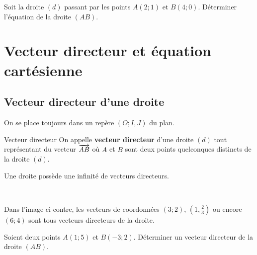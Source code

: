 \documentclass[11pt]{article}
\begin{document}
\begin{app}
  Soit la droite $(d)$ passant par les points $A\left( 2; 1 \right)$ et $B\left(
  4;0 \right)$. Déterminer l'équation de la droite $\left( AB \right)$.
\end{app}

\section{Vecteur directeur et équation cartésienne}
\subsection{Vecteur directeur d'une droite}
On se place toujours dans un repère $(O; I, J)$ du plan.
\begin{defi}{Vecteur directeur}
  On appelle \textbf{vecteur directeur} d'une droite $(d)$ tout représentant du vecteur
  $\overrightarrow{AB}$ où $A$ et $B$ sont deux points quelconques distincts de la droite
  $(d)$.
\end{defi}
\begin{rmq}
  Une droite possède une infinité de vecteurs directeurs.
\end{rmq}
\begin{exemple}~\\
  \begin{minipage}[]{.5\textwidth}
    Dans l'image ci-contre, les vecteurs de coordonnées $\left( 3; 2 \right)$,
    $\left( 1, \frac{2}{3} \right)$ ou encore $\left( 6; 4 \right)$ sont tous
    vecteurs directeurs de la droite. 
  \end{minipage}
  \begin{minipage}[]{.5\textwidth}
    \begin{center}
    \end{center}
  \end{minipage}
\end{exemple}
\begin{app}
  Soient deux points $A\left( 1;5 \right)$ et $B\left( -3;2 \right)$. Déterminer
  un vecteur directeur de la droite $\left( AB \right)$.
\end{app}
\end{document}
